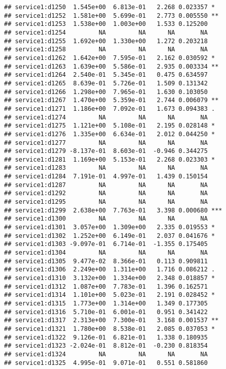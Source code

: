 \documentclass[
]{article}
\begin{document}
\begin{verbatim}
## service1:d1250  1.545e+00  6.813e-01   2.268 0.023357 *  
## service1:d1252  1.581e+00  5.699e-01   2.773 0.005550 ** 
## service1:d1253  1.538e+00  1.003e+00   1.533 0.125200    
## service1:d1254         NA         NA      NA       NA    
## service1:d1255  1.692e+00  1.330e+00   1.272 0.203218    
## service1:d1258         NA         NA      NA       NA    
## service1:d1262  1.642e+00  7.595e-01   2.162 0.030592 *  
## service1:d1263  1.639e+00  5.586e-01   2.935 0.003334 ** 
## service1:d1264  2.540e-01  5.345e-01   0.475 0.634597    
## service1:d1265  8.639e-01  5.726e-01   1.509 0.131342    
## service1:d1266  1.298e+00  7.965e-01   1.630 0.103050    
## service1:d1267  1.470e+00  5.359e-01   2.744 0.006079 ** 
## service1:d1271  1.186e+00  7.092e-01   1.673 0.094383 .  
## service1:d1274         NA         NA      NA       NA    
## service1:d1275  1.121e+00  5.108e-01   2.195 0.028148 *  
## service1:d1276  1.335e+00  6.634e-01   2.012 0.044250 *  
## service1:d1277         NA         NA      NA       NA    
## service1:d1279 -8.137e-01  8.603e-01  -0.946 0.344275    
## service1:d1281  1.169e+00  5.153e-01   2.268 0.023303 *  
## service1:d1283         NA         NA      NA       NA    
## service1:d1284  7.191e-01  4.997e-01   1.439 0.150154    
## service1:d1287         NA         NA      NA       NA    
## service1:d1292         NA         NA      NA       NA    
## service1:d1295         NA         NA      NA       NA    
## service1:d1299  2.638e+00  7.763e-01   3.398 0.000680 ***
## service1:d1300         NA         NA      NA       NA    
## service1:d1301  3.057e+00  1.309e+00   2.335 0.019553 *  
## service1:d1302  1.252e+00  6.149e-01   2.037 0.041676 *  
## service1:d1303 -9.097e-01  6.714e-01  -1.355 0.175405    
## service1:d1304         NA         NA      NA       NA    
## service1:d1305  9.477e-02  8.366e-01   0.113 0.909811    
## service1:d1306  2.249e+00  1.311e+00   1.716 0.086212 .  
## service1:d1310  3.132e+00  1.334e+00   2.348 0.018857 *  
## service1:d1312  1.087e+00  7.783e-01   1.396 0.162571    
## service1:d1314  1.101e+00  5.023e-01   2.191 0.028452 *  
## service1:d1315  1.773e+00  1.314e+00   1.349 0.177305    
## service1:d1316  5.710e-01  6.001e-01   0.951 0.341422    
## service1:d1317  2.313e+00  7.300e-01   3.168 0.001537 ** 
## service1:d1321  1.780e+00  8.538e-01   2.085 0.037053 *  
## service1:d1322  9.126e-01  6.821e-01   1.338 0.180935    
## service1:d1323 -2.024e-01  8.812e-01  -0.230 0.818354    
## service1:d1324         NA         NA      NA       NA    
## service1:d1325  4.995e-01  9.071e-01   0.551 0.581860    

\end{verbatim}
\end{document}
